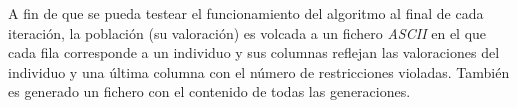A fin de que se pueda testear el funcionamiento del algoritmo al final de cada iteración, la población (su valoración) es volcada a un fichero \textit{ASCII} en el que cada fila corresponde a un individuo y sus columnas reflejan las valoraciones del individuo y una última columna con el número de restricciones violadas. También es generado un fichero con el contenido de todas las generaciones.\\




